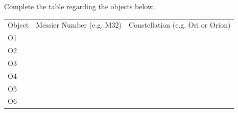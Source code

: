Complete the table regarding the objects below.
\begin{center}\begin{tabular}{lll}
Object & Messier Number (e.g. M32) & Constellation (e.g. Ori or Orion)\\
O1 & & \\ O2 & & \\ O3 & & \\ O4 & & \\ O5 & & \\ O6 & &
\end{tabular}\end{center}

